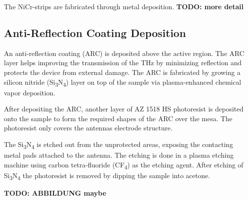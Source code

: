 The NiCr-strips are fabricated through metal deposition. 
\textbf{TODO: more detail}

\subsection{Anti-Reflection Coating Deposition}
An anti-reflection coating (ARC) is deposited above the active region. The ARC layer helps improving the transmission of the THz by minimizing reflection \cite{chenAntireflectionImplementationsTerahertz2014} and protects the device from external damage. The ARC is fabricated by growing a silicon nitride (Si\textsubscript{3}N\textsubscript{4}) layer on top of the sample via plasma-enhanced chemical vapor deposition. 

After depositing the ARC, another layer of AZ 1518 HS photoresist is deposited onto the sample to form the required shapes of the ARC over the mesa. The photoresist only covers the antennas electrode structure. 

The Si\textsubscript{3}N\textsubscript{4} is etched out from the unprotected areas, exposing the contacting metal pads attached to the antenna. The etching is done in a plasma etching machine using carbon tetra-fluoride (CF\textsubscript{4}) as the etching agent. After etching of Si\textsubscript{3}N\textsubscript{4} the photoresist is removed by dipping the sample into acetone.


\textbf{TODO: ABBILDUNG maybe}